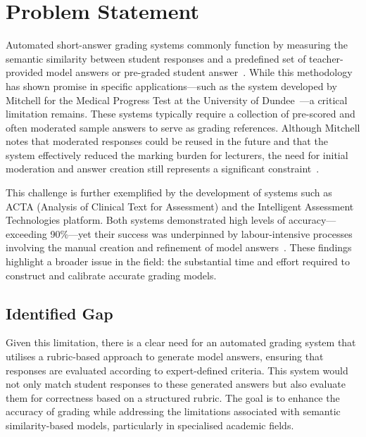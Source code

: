 \documentclass[a4paper,10pt]{article}
\begin{document}
\section{Problem Statement}

Automated short-answer grading systems commonly function by measuring the semantic similarity between student responses and a predefined set of teacher-provided model answers or pre-graded student answer~\cite{burrows2015eras,mitchell2003computerised}. While this methodology has shown promise in specific applications—such as the system developed by Mitchell for the Medical Progress Test at the University of Dundee~\cite{mitchell2003computerised}—a critical limitation remains. These systems typically require a collection of pre-scored and often moderated sample answers to serve as grading references. Although Mitchell notes that moderated responses could be reused in the future and that the system effectively reduced the marking burden for lecturers, the need for initial moderation and answer creation still represents a significant constraint~\cite{mitchell2003computerised}.\newline\newline

This challenge is further exemplified by the development of systems such as ACTA (Analysis of Clinical Text for Assessment) and the Intelligent Assessment Technologies platform. Both systems demonstrated high levels of accuracy—exceeding 90\%—yet their success was underpinned by labour-intensive processes involving the manual creation and refinement of model answers~\cite{clauser2024automated, mitchell2003computerised}. These findings highlight a broader issue in the field: the substantial time and effort required to construct and calibrate accurate grading models.

\subsection{Identified Gap}
Given this limitation, there is a clear need for an automated grading system that utilises a rubric-based approach to generate model answers, ensuring that responses are evaluated according to expert-defined criteria. This system would not only match student responses to these generated answers but also evaluate them for correctness based on a structured rubric. The goal is to enhance the accuracy of grading while addressing the limitations associated with semantic similarity-based models, particularly in specialised academic fields.
\end{document}
